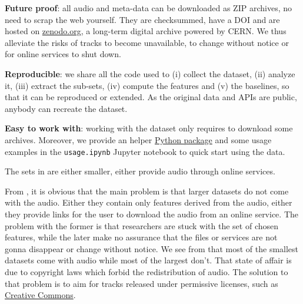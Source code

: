 \documentclass{article}
\begin{document}
\textbf{Future proof}: all audio and meta-data can be downloaded as ZIP archives, no need to scrap the web yourself. They are checksummed, have a DOI and are hosted on \href{https://zenodo.org}{zenodo.org}, a long-term digital archive powered by CERN. We thus alleviate the risks of tracks to become unavailable, to change without notice or for online services to shut down.

\textbf{Reproducible}: we share all the code used to (i) collect the dataset, (ii) analyze it, (iii) extract the sub-sets, (iv) compute the features and (v) the baselines, so that it can be reproduced or extended. As the original data and APIs are public, anybody can recreate the dataset.

\textbf{Easy to work with}: working with the dataset only requires to download some archives. Moreover, we provide an helper \href{https://pypi.python.org/pypi/freemusicarchive}{Python package} and some usage examples in the \texttt{usage.ipynb} Jupyter notebook to quick start using the data.



The sets in  are either smaller, either provide audio through online services.

From , it is obvious that the main problem is that larger datasets do not come with the audio. Either they contain only features derived from the audio, either they provide links for the user to download the audio from an online service. The problem with the former is that researchers are stuck with the set of chosen features, while the later make no assurance that the files or services are not gonna disappear or change without notice.
We see from  that most of the smallest datasets come with audio while most of the largest don't. That state of affair is due to copyright laws which forbid the redistribution of audio. The solution to that problem is to aim for tracks released under permissive licenses, such as \href{https://creativecommons.org/}{Creative Commons}.
\end{document}
